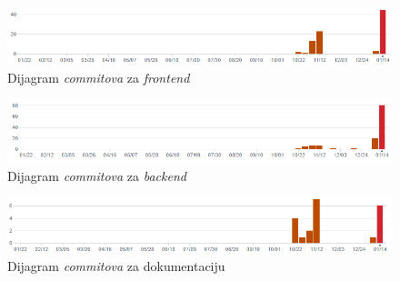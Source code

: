 		\begin{figure}[H]
			\includegraphics[scale=0.75]{slike/aktivnosti1.png} %
			\centering
			\caption{Dijagram \textit{commitova} za \textit{frontend}}
			\label{fig:commit1}
		\end{figure}
		\begin{figure}[H]
			\includegraphics[scale=0.75]{slike/aktivnosti2.png} %
			\centering
			\caption{Dijagram \textit{commitova} za \textit{backend}}
			\label{fig:commit2}
		\end{figure}
		\begin{figure}[H]
			\includegraphics[scale=0.75]{slike/aktivnosti3.png} %
			\centering
			\caption{Dijagram \textit{commitova} za dokumentaciju}
			\label{fig:commit3}
		\end{figure}
		
	